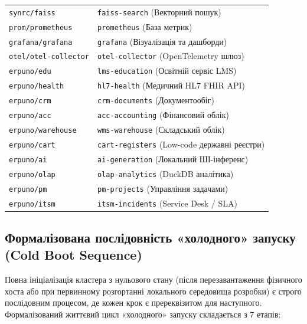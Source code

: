 \documentclass[12pt,a4paper]{article}
\begin{document}
{\begin{longtable}{L{6.5cm} L{7.5cm}}
\texttt{synrc/faiss}         & \texttt{faiss-search} (Векторний пошук) \\[2pt]
\texttt{prom/prometheus}     & \texttt{prometheus} (База метрик) \\[2pt]
\texttt{grafana/grafana}     & \texttt{grafana} (Візуалізація та дашборди) \\[2pt]
\texttt{otel/otel-collector} & \texttt{otel-collector} (OpenTelemetry шлюз) \\[2pt]
\texttt{erpuno/edu}          & \texttt{lms-education} (Освітній сервіс LMS) \\[2pt]
\texttt{erpuno/health}       & \texttt{hl7-health} (Медичний HL7 FHIR API) \\[2pt]
\texttt{erpuno/crm}          & \texttt{crm-documents} (Документообіг) \\[2pt]
\texttt{erpuno/acc}          & \texttt{acc-accounting} (Фінансовий облік) \\[2pt]
\texttt{erpuno/warehouse}    & \texttt{wms-warehouse} (Складський облік) \\[2pt]
\texttt{erpuno/cart}         & \texttt{cart-registers} (Low-code державні реєстри) \\[2pt]
\texttt{erpuno/ai}           & \texttt{ai-generation} (Локальний ШІ-інференс) \\[2pt]
\texttt{erpuno/olap}         & \texttt{olap-analytics} (DuckDB аналітика) \\[2pt]
\texttt{erpuno/pm}           & \texttt{pm-projects} (Управління задачами) \\[2pt]
\texttt{erpuno/itsm}         & \texttt{itsm-incidents} (Service Desk / SLA) \\
\end{longtable}
}

\subsection{Формалізована послідовність «холодного» запуску (Cold Boot Sequence)}

Повна ініціалізація кластера з нульового стану (після перезавантаження фізичного хоста або при первинному
розгортанні локального середовища розробки) є строго послідовним процесом, де кожен крок є пререквізитом
для наступного. Формалізований життєвий цикл «холодного» запуску складається з 7 етапів:
\end{document}
